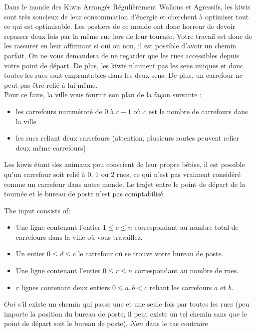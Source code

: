 

Dans le monde des Kiwis Arrangés Régulièrement Wallons et Agressifs, les kiwis sont très soucieux de leur consommation d'énergie et cherchent à optimiser tout ce qui est optimisable. Les postiers de ce monde ont donc horreur de devoir repasser deux fois par la même rue lors de leur tournée. Votre travail est donc de les rassurer en leur affirmant si oui ou non, il est possible d'avoir un chemin parfait. On ne vous demandera de ne regarder que les rues accessibles depuis votre point de départ. De plus, les kiwis n'aiment pas les sens uniques et donc toutes les rues sont empruntables dans les deux sens. De plus, un carrefour ne peut pas être relié à lui même.\\
Pour ce faire, la ville vous fournit son plan de la façon suivante :


\begin{itemize}
\item les carrefours numméroté de 0 à $c-1$ où $c$ est le nombre de carrefours dans la ville
\item les rues reliant deux carrefours (attention, plusieurs routes peuvent relier deux même carrefours)
\end{itemize}
Les kiwis étant des animaux peu conscient de leur propre bêtise, il est possible qu'un carrefour soit relié à $0$, $1$ ou $2$ rues, ce qui n'est pas vraiment considéré comme un carrefour dans notre monde.
Le trajet entre le point de départ de la tournée et le bureau de poste n'est pas comptabilisé. 


\begin{Input}
    The input consists of:
    \begin{itemize}
        \item Une ligne contenant l'entier $1 \leq c \leq n$ correspondant au nombre total de carrefours dans la ville où vous travaillez.
        \item Un entier $0\leq d \leq c$ le carrefour où se trouve votre bureau de poste.
        \item Une ligne contenant l'entier $0 \leq r \leq n$ correspondant au nombre de rues.
        \item $r$ lignes contenant deux entiers $0\leq a,b < c$ reliant les carrefours $a$ et $b$.
    \end{itemize}
\end{Input}

\begin{Output}
    $Oui$ s'il existe un chemin qui passe une et une seule fois par toutes les rues (peu importe la position du bureau de poste, il peut existe un tel chemin sans que le point de départ soit le bureau de poste). $Non$ dans le cas contraire
\end{Output}
